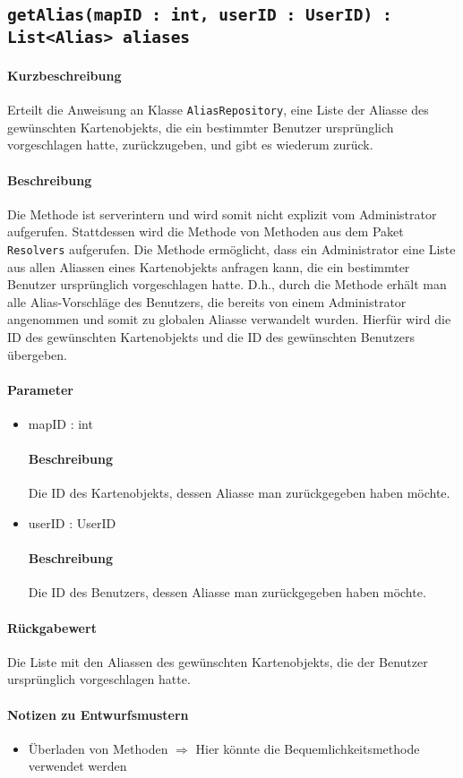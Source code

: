 \subsection{\texttt{getAlias(mapID : int, userID : UserID) : List<Alias> aliases}}%
\paragraph*{Kurzbeschreibung}
Erteilt die Anweisung an Klasse \texttt{AliasRepository}, eine Liste der Aliasse des gewünschten Kartenobjekts, die ein bestimmter Benutzer ursprünglich vorgeschlagen hatte, zurückzugeben, und gibt es wiederum zurück.
\paragraph*{Beschreibung}
Die Methode ist serverintern und wird somit nicht explizit vom Administrator aufgerufen.
Stattdessen wird die Methode von Methoden aus dem Paket \texttt{Resolvers} aufgerufen.
Die Methode ermöglicht, dass ein Administrator eine Liste aus allen Aliassen eines Kartenobjekts anfragen kann, die ein bestimmter Benutzer ursprünglich vorgeschlagen hatte.
D.h., durch die Methode erhält man alle Alias-Vorschläge des Benutzers, die bereits von einem Administrator angenommen und somit zu globalen Aliasse verwandelt wurden.
Hierfür wird die ID des gewünschten Kartenobjekts und die ID des gewünschten Benutzers übergeben.
\paragraph*{Parameter}
\begin{itemize}
    \item mapID : int
    		\paragraph*{Beschreibung}
    		Die ID des Kartenobjekts, dessen Aliasse man zurückgegeben haben möchte.
    	\item userID : UserID
    		\paragraph*{Beschreibung}
    		Die ID des Benutzers, dessen Aliasse man zurückgegeben haben möchte.
\end{itemize}
\paragraph*{Rückgabewert}
Die Liste mit den Aliassen des gewünschten Kartenobjekts, die der Benutzer ursprünglich vorgeschlagen hatte.

\paragraph*{Notizen zu Entwurfsmustern}
\begin{itemize}
	\item Überladen von Methoden $\Rightarrow$ Hier könnte die Bequemlichkeitsmethode verwendet werden
\end{itemize}
